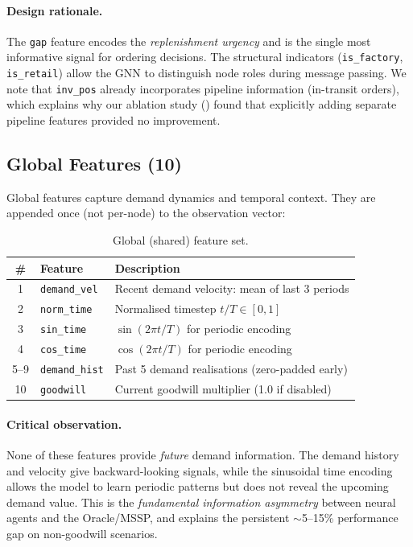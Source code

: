 \paragraph{Design rationale.}
The \texttt{gap} feature encodes the \emph{replenishment urgency} and is the
single most informative signal for ordering decisions. The structural
indicators (\texttt{is\_factory}, \texttt{is\_retail}) allow the GNN to
distinguish node roles during message passing. We note that
\texttt{inv\_pos} already incorporates pipeline information (in-transit
orders), which explains why our ablation study ()
found that explicitly adding separate pipeline features provided
no improvement.

\subsection{Global Features (10)}

Global features capture demand dynamics and temporal context. They are
appended once (not per-node) to the observation vector:

\begin{table}[htbp]
\centering
\caption{Global (shared) feature set.}
\label{tab:global_features}
\small
\begin{tabular}{cll}
\toprule
\textbf{\#} & \textbf{Feature} & \textbf{Description} \\
\midrule
1 & \texttt{demand\_vel} & Recent demand velocity: mean of last 3 periods \\
2 & \texttt{norm\_time} & Normalised timestep $t/T \in [0,1]$ \\
3 & \texttt{sin\_time} & $\sin(2\pi t / T)$ for periodic encoding \\
4 & \texttt{cos\_time} & $\cos(2\pi t / T)$ for periodic encoding \\
5--9 & \texttt{demand\_hist} & Past 5 demand realisations (zero-padded early) \\
10 & \texttt{goodwill} & Current goodwill multiplier (1.0 if disabled) \\
\bottomrule
\end{tabular}
\end{table}

\paragraph{Critical observation.}
None of these features provide \emph{future} demand information. The
demand history and velocity give backward-looking signals, while the
sinusoidal time encoding allows the model to learn periodic patterns
but does not reveal the upcoming demand value. This is the
\emph{fundamental information asymmetry} between neural agents and
the Oracle/MSSP, and explains the persistent $\sim$5--15\% performance
gap on non-goodwill scenarios.


